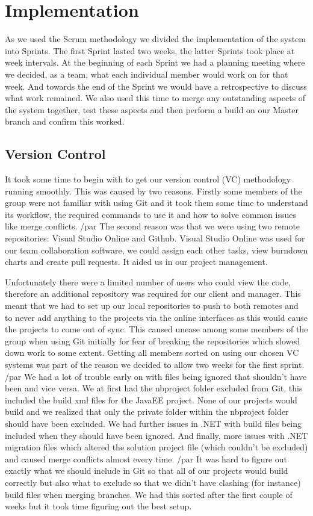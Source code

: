 \chapter{Implementation}

As we used the Scrum methodology we divided the implementation of the system into Sprints. The first Sprint lasted two weeks, the latter Sprints took place at week intervals. At the beginning of each Sprint we had a planning meeting where we decided, as a team, what each individual member would work on for that week. And towards the end of the Sprint we would have a retrospective to discuss what work remained. We also used this time to merge any outstanding aspects of the system together, test these aspects and then perform a build on our Master branch and confirm this worked.
\section{Version Control}
It took some time to begin with to get our version control (VC) methodology running smoothly. This was caused by two reasons. Firstly some members of the group were not familiar with using Git and it took them some time to understand its workflow, the required commands to use it and how to solve common issues like merge conflicts. /par
The second reason was that we were using two remote repositories: Visual Studio Online\cite{VSO} and Github\cite{Github}. Visual Studio Online was used for our team collaboration software, we could assign each other tasks, view burndown charts and create pull requests. It aided us in our project management. \par
Unfortunately there were a limited number of users who could view the code, therefore an additional repository was required for our client and manager. This meant that we had to set up our local repositories to push to both remotes and to never add anything to the projects via the online interfaces as this would cause the projects to come out of sync. This caused unease among some members of the group when using Git initially for fear of breaking the repositories which slowed down work to some extent. Getting all members sorted on using our chosen VC systems was part of the reason we decided to allow two weeks for the first sprint. /par
We had a lot of trouble early on with files being ignored that shouldn’t have been and vice versa. We at first had the nbproject folder excluded from Git, this included the build xml files for the JavaEE project. None of our projects would build and we realized that only the private folder within the nbproject folder should have been excluded. We had further issues in .NET with build files being included when they should have been ignored. And finally, more issues with .NET migration files which altered the solution project file (which couldn’t be excluded) and caused merge conflicts almost every time. /par
It was hard to figure out exactly what we should include in Git so that all of our projects would build correctly but also what to exclude so that we didn’t have clashing (for instance) build files when merging branches. We had this sorted after the first couple of weeks but it took time figuring out the best setup. 
